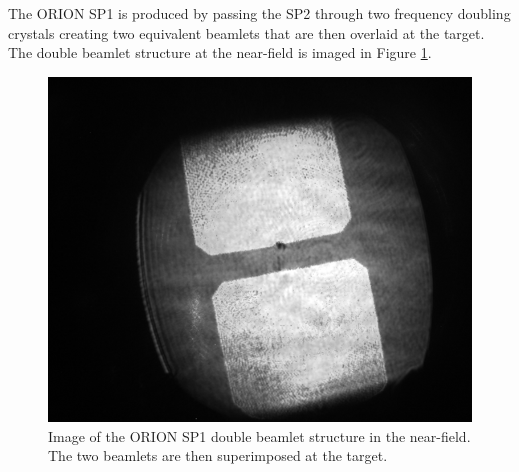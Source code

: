 The ORION SP1 is produced by passing the SP2 through two frequency doubling crystals creating two equivalent beamlets that are then overlaid at the target. The double beamlet structure at the near-field is imaged in Figure \ref{fig:oriondoublebeamletsnearfield}.
\begin{figure}
	\centering
	\includegraphics[width=0.5\linewidth]{figures/orion/orion_doublebeamlets_near_field}
	\caption[Image of the ORION SP1 double beamlet structure in the near-field.]{Image of the ORION SP1 double beamlet structure in the near-field. The two beamlets are then superimposed at the target.}
	\label{fig:oriondoublebeamletsnearfield}
\end{figure}

